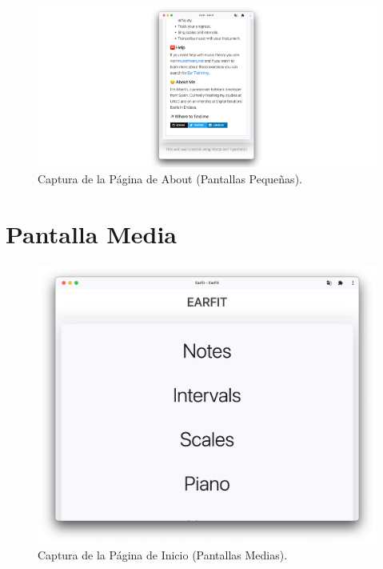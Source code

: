 \documentclass[12pt,twoside,titlepage]{report}
\begin{document}
{\begin{figure}[H]
    \centering
    \includegraphics[scale=0.7]{Capturas Earfit/Movil/Movil4}
    \caption{Captura de la Página de About (Pantallas Pequeñas).}
    \label{fig:Movil4}
\end{figure}

\section{Pantalla Media}

\begin{figure}[H]
    \centering
    \includegraphics[scale=0.3]{Capturas Earfit/Tablet/Menu}
    \caption{Captura de la Página de Inicio (Pantallas Medias).}
    \label{fig:TabletMenu}
\end{figure}

}
\end{document}
